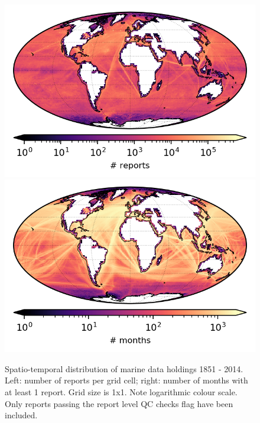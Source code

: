 \begin{figure}[h]
\includegraphics{resources/header-reports-map-optimal.png}
\includegraphics{resources/header-months-map-optimal.png}
\caption{Spatio-temporal distribution of marine data holdings 1851 - 2014. Left: number of reports per grid cell; right: number of months with at least 1 report. Grid size is 1x1. Note logarithmic colour scale. Only reports passing the report level QC checks flag have been included.}
\label{fig:nreports-map1}
\end{figure}


